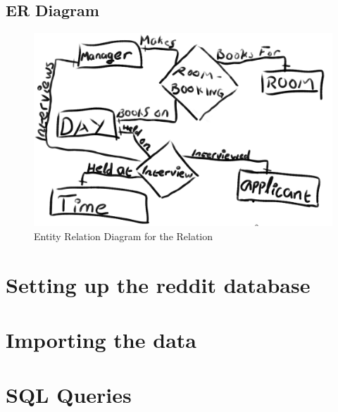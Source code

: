 \documentclass[12pt]{article}
\begin{document}
\subsection {ER Diagram}\label{subsec:er-diagram}
\begin {figure}[h]
\includegraphics[width=\textwidth]{ER}
\caption {Entity Relation Diagram for the Relation}\label{fig:figure2}
\end {figure}

\section {Setting up the reddit database}\label{sec:setting-up-the-reddit-database}
\section {Importing the data}\label{sec:importing-the-data}
\section {SQL Queries}\label{sec:sql-queries}
\end{document}
